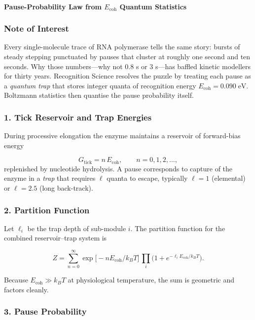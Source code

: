 \documentclass[11pt,oneside]{book}
\begin{document}
\bigskip
\paragraph{Pause-Probability Law from \texorpdfstring{$E_{\text{coh}}$}{Ecoh} Quantum Statistics}
\label{sec:pause-prob-law}

\subsubsection*{Note of Interest}

Every single-molecule trace of RNA polymerase tells the same story:
bursts of steady stepping punctuated by pauses that cluster at roughly
one second and ten seconds.
Why those numbers—why not 0.8 s or 3 s—has baffled kinetic modellers for
thirty years.
Recognition Science resolves the puzzle by treating each pause as a
\emph{quantum trap} that stores integer quanta of recognition energy
\(E_{\text{coh}} = 0.090\;\text{eV}\).
Boltzmann statistics then quantise the pause probability itself.

\subsubsection*{1. Tick Reservoir and Trap Energies}

During processive elongation the enzyme maintains a reservoir of
forward-bias energy

\[
   G_{\text{tick}} = n\,E_{\text{coh}},
   \qquad
   n = 0,1,2,\dots,
\]
replenished by nucleotide hydrolysis.
A pause corresponds to capture of the enzyme in a \emph{trap} that
requires \(\ell\) quanta to escape, typically \(\ell=1\) (elemental) or
\(\ell=2{.}5\) (long back-track).

\subsubsection*{2. Partition Function}

Let \(\ell_i\) be the trap depth of sub-module \(i\).
The partition function for the combined reservoir–trap system is

\[
   Z =
   \sum_{n=0}^{\infty}
     \exp\!\bigl[-nE_{\text{coh}}/k_BT\bigr]\,
     \prod_{i}\bigl(1+e^{-\ell_iE_{\text{coh}}/k_BT}\bigr).
\]

Because \(E_{\text{coh}}\!\gg\!k_BT\) at physiological temperature, the
sum is geometric and factors cleanly.

\subsubsection*{3. Pause Probability}
\end{document}
